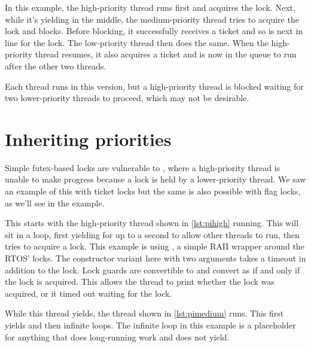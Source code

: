 In this example, the high-priority thread runs first and acquires the lock.
Next, while it's yielding in the middle, the medium-priority thread tries to acquire the lock and blocks.
Before blocking, it successfully receives a ticket and so is next in line for the lock.
The low-priority thread then does the same.
When the high-priority thread resumes, it also acquires a ticket and is now in the queue to run after the other two threads.

Each thread runs in this version, but a high-priority thread is blocked waiting for two lower-priority threads to proceed, which may not be desirable.

\section[label=priority_inheritance]{Inheriting priorities}

Simple futex-based locks are vulnerable to , where a high-priority thread is unable to make progress because a lock is held by a lower-priority thread.
We saw an example of this with ticket locks but the same is also possible with flag locks, as we'll see in the  example.

This starts with the high-priority thread shown in \ref{lst:pihigh} running.
This will sit in a loop, first yielding for up to a second to allow other threads to run, then tries to acquire a lock.
This example is using , a simple RAII wrapper around the RTOS' locks.
The constructor variant here with two arguments takes a timeout in addition to the lock.
Lock guards are convertible to  and convert as  if and only if the lock is acquired.
This allows the thread to print whether the lock was acquired, or it timed out waiting for the lock.

\codelisting[filename=examples/priority_inheritance/priority_inheritance.cc,marker=high,label=lst:pihigh,caption="A high-priority thread that will be starved"]{}

While this thread yields, the thread shown in \ref{lst:pimedium} runs.
This first yields and then infinite loops.
The infinite loop in this example is a placeholder for anything that does long-running work and does not yield.

\codelisting[filename=examples/priority_inheritance/priority_inheritance.cc,marker=medium,label=lst:pimedium,caption="A medium-priority thread that will starve a high-priority thread"]{}

